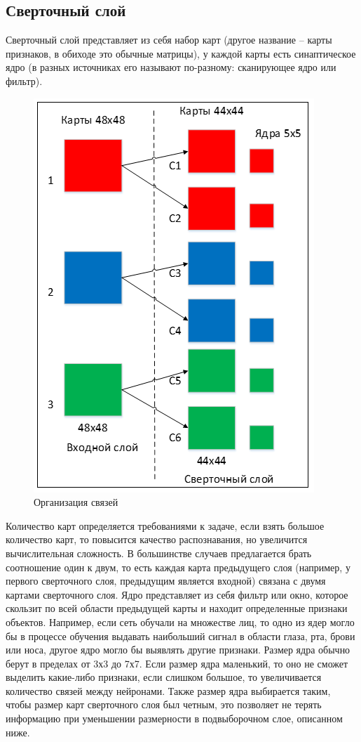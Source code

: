 \documentclass[paper=a4, fontsize=11pt]{scrartcl} %
\numberwithin{equation}{section} %
\numberwithin{figure}{section} %
\numberwithin{table}{section} %
\begin{document}
	\subsection{Сверточный слой}
	Сверточный слой представляет из себя набор карт (другое название – карты признаков, в обиходе это обычные матрицы), у каждой карты есть синаптическое ядро (в разных источниках его называют по-разному: сканирующее ядро или фильтр). 
	\begin{figure}
		\centering
		\includegraphics[scale=0.2]{karts}
		\caption{Организация связей}
	\end{figure}
	Количество карт определяется требованиями к задаче, если взять большое количество карт, то повысится качество распознавания, но увеличится вычислительная сложность. 
	В большинстве случаев предлагается брать соотношение один к двум, то есть каждая карта предыдущего слоя (например, у первого сверточного слоя, предыдущим является входной) связана с двумя картами сверточного слоя. Ядро представляет из себя фильтр или окно, которое скользит по всей области предыдущей карты и находит определенные признаки объектов. Например, если сеть обучали на множестве лиц, то одно из ядер могло бы в процессе обучения выдавать наибольший сигнал в области глаза, рта, брови или носа, другое ядро могло бы выявлять другие признаки. Размер ядра обычно берут в пределах от 3х3 до 7х7. Если размер ядра маленький, то оно не сможет выделить какие-либо признаки, если слишком большое, то увеличивается количество связей между нейронами. Также размер ядра выбирается таким, чтобы размер карт сверточного слоя был четным, это позволяет не терять информацию при уменьшении размерности в подвыборочном слое, описанном ниже. 
	
\end{document}
